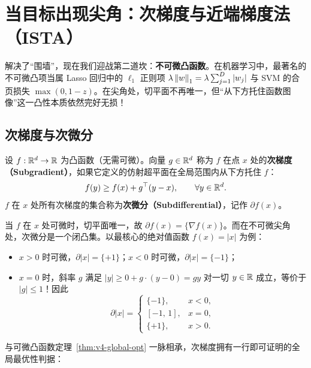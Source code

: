 \section{当目标出现尖角：次梯度与近端梯度法（ISTA）}

解决了“围墙”，现在我们迎战第二道坎：\textbf{不可微凸函数}。在机器学习中，最著名的不可微凸项当属 Lasso 回归中的 $\ell_1$ 正则项 $\lambda\left\|w\right\|_1 = \lambda\sum_{j=1}^D |w_j|$ 与 SVM 的合页损失 $\max(0, 1 - z)$。在尖角处，切平面不再唯一，但“从下方托住函数图像”这一凸性本质依然完好无损！

\subsection{次梯度与次微分}

\begin{defBox}
\begin{definition}[次梯度与次微分]\label{def:v4-subgrad}
设 $f: \mathbb{R}^d \to \mathbb{R}$ 为凸函数（无需可微）。向量 $g \in \mathbb{R}^d$ 称为 $f$ 在点 $x$ 处的\textbf{次梯度（Subgradient）}，如果它定义的仿射超平面在全局范围内从下方托住 $f$：
\begin{equation}\label{eq:v4-subgrad-def}
  f(y) \ge f(x) + g^\top (y - x), \qquad \forall y \in \mathbb{R}^d.
\end{equation}
$f$ 在 $x$ 处所有次梯度的集合称为\textbf{次微分（Subdifferential）}，记作 $\partial f(x)$。
\end{definition}
\end{defBox}

当 $f$ 在 $x$ 处可微时，切平面唯一，故 $\partial f(x) = \{\nabla f(x)\}$。而在不可微尖角处，次微分是一个闭凸集。以最核心的绝对值函数 $f(x) = |x|$ 为例：
\begin{itemize}
  \item $x > 0$ 时可微，$\partial |x| = \{+1\}$；$x < 0$ 时可微，$\partial |x| = \{-1\}$；
  \item $x = 0$ 时，斜率 $g$ 满足 $|y| \ge 0 + g\cdot(y - 0) = g y$ 对一切 $y \in \mathbb{R}$ 成立，等价于 $|g| \le 1$！因此
  \begin{equation}\label{eq:v4-subdiff-abs}
    \partial |x| =
    \begin{cases}
      \{-1\}, & x < 0, \\
      [-1,\, 1], & x = 0, \\
      \{+1\}, & x > 0.
    \end{cases}
  \end{equation}
\end{itemize}
与可微凸函数定理~\ref{thm:v4-global-opt} 一脉相承，次梯度拥有一行即可证明的全局最优性判据：

